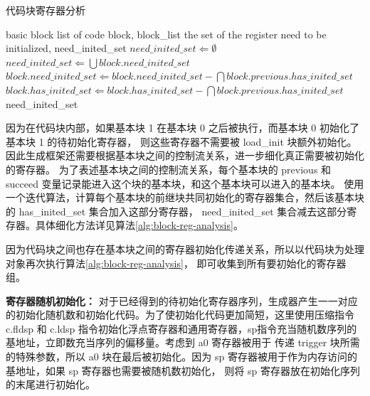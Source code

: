 \begin{algorithm}[!h]
    
    \caption{代码块寄存器分析}
    \label{alg:block-reg-analysis}
    \renewcommand{\algorithmicrequire}{\textbf{Input:}}
    \renewcommand{\algorithmicensure}{\textbf{Output:}}
    
    \begin{algorithmic}[1]
        \REQUIRE basic block list of code block, block\_list    %
        \ENSURE  the set of the register need to be initialized, need\_inited\_set  %
        \STATE $need\_inited\_set \Leftarrow \emptyset$
            \STATE $need\_inited\_set \Leftarrow \bigcup block.need\_inited\_set$
                \STATE $block.need\_inited\_set \Leftarrow block.need\_inited\_set - \bigcap block.previous.has\_inited\_set$
                \STATE $block.has\_inited\_set \Leftarrow block.has\_inited\_set - \bigcap block.previous.has\_inited\_set$
            \ENDFOR
        \ENDWHILE
        \RETURN need\_inited\_set
    \end{algorithmic}
\end{algorithm}

因为在代码块内部，如果基本块 1 在基本块 0 之后被执行，而基本块 0 初始化了基本块 1 的待初始化寄存器，
则这些寄存器不需要被 load\_init 块额外初始化。因此生成框架还需要根据基本块之间的控制流关系，进一步细化真正需要被初始化的寄存器。
为了表述基本块之间的控制流关系，每个基本块的 previous 和 succeed 变量记录能进入这个块的基本块，和这个基本块可以进入的基本块。
使用一个迭代算法，计算每个基本块的前继块共同初始化的寄存器集合，然后该基本块的 has\_inited\_set 集合加入这部分寄存器，
need\_inited\_set 集合减去这部分寄存器。具体细化方法详见算法\ref{alg:block-reg-analysis}。\par

因为代码块之间也存在基本块之间的寄存器初始化传递关系，所以以代码块为处理对象再次执行算法\ref{alg:block-reg-analysis}，
即可收集到所有要初始化的寄存器组。\par

\textbf{寄存器随机初始化：}
对于已经得到的待初始化寄存器序列，生成器产生一一对应的初始化随机数和初始化代码。为了使初始化代码更加简短，这里使用压缩指令
c.fldsp 和 c.ldsp 指令初始化浮点寄存器和通用寄存器，sp指令充当随机数序列的基地址，立即数充当序列的偏移量。考虑到 a0 寄存器被用于
传递 trigger 块所需的特殊参数，所以 a0 块在最后被初始化。因为 sp 寄存器被用于作为内存访问的基地址，如果 sp 寄存器也需要被随机数初始化，
则将 sp 寄存器放在初始化序列的末尾进行初始化。\par

